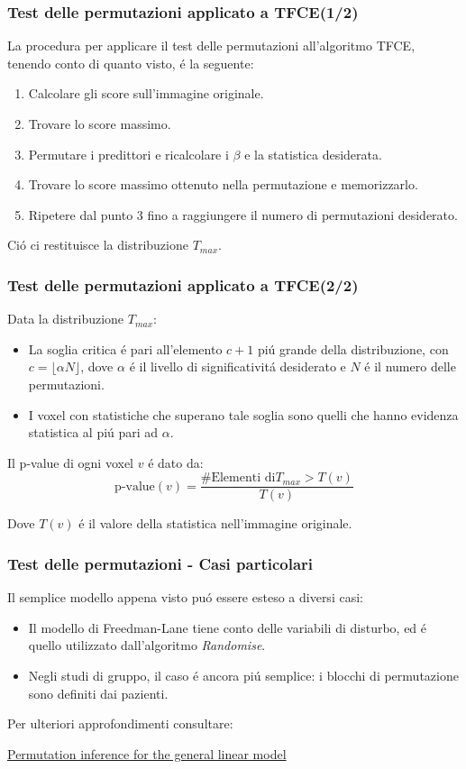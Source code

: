 \documentclass{beamer}
\begin{document}
\begin{frame}
\frametitle{Test delle permutazioni applicato a TFCE(1/2)}
La procedura per applicare il test delle permutazioni all'algoritmo TFCE, tenendo conto di quanto visto, \'e la seguente:
\begin{enumerate}
\item Calcolare gli score sull'immagine originale.
\item Trovare lo score massimo.
\item Permutare i predittori e ricalcolare i $\beta$ e la statistica desiderata.
\item Trovare lo score massimo ottenuto nella permutazione e memorizzarlo.
\item Ripetere dal punto 3 fino a raggiungere il numero di permutazioni desiderato.
\end{enumerate}

Ci\'o ci restituisce la distribuzione $T_{max}$.

\end{frame}
\begin{frame}
\frametitle{Test delle permutazioni applicato a TFCE(2/2)}
Data la distribuzione $T_{max}$:
\begin{itemize}
\item La soglia critica \'e pari all'elemento $c+1$ pi\'u grande della distribuzione, con $c = \lfloor \alpha N \rfloor$, dove $\alpha$ \'e il livello di significativit\'a desiderato e $N$ \'e il numero delle permutazioni.
\item I voxel con statistiche che superano tale soglia sono quelli che hanno evidenza statistica al pi\'u pari ad $\alpha$.
\end{itemize}

Il p-value di ogni voxel  $v$ \'e dato da:
$$\text{p-value}(v) = \frac{\text{\#Elementi di} T_{max} > T(v)}{T(v)}$$

Dove $T(v)$ \'e il valore della statistica nell'immagine originale.

\end{frame}

\begin{frame}
\frametitle{Test delle permutazioni - Casi particolari}
Il semplice modello appena visto pu\'o essere esteso a diversi casi:
\begin{itemize}
\item Il modello di Freedman-Lane tiene conto delle variabili di disturbo, ed \'e quello utilizzato dall'algoritmo \emph{Randomise}.
\item Negli studi di gruppo, il caso \'e ancora pi\'u semplice: i blocchi di permutazione sono definiti dai pazienti.
\end{itemize}
Per ulteriori approfondimenti consultare:

\center\href{http://www.sciencedirect.com/science/article/pii/S1053811914000913}{Permutation inference for the general linear model}
\end{frame}
\end{document}
